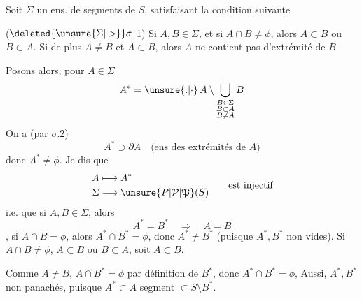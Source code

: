 Soit $\Sigma$ un ens. de segments de $S$, satisfaisant la condition suivante

($\deleted{\unsure{\Sigma|>}}\sigma$ 1) Si $A,B\in\Sigma$, et si $A\cap B\ne\phi$, alors $A\subset B$ ou $B\subset A$.  Si de plus $A\ne B$ et $A\subset B$, alors $A$ ne contient pas d'extrémité de $B$.

Posons alors, pour $A\in\Sigma$
\[
 A^*=\unsure{.|\cdot}\, A\setminus\bigcup_{\substack{B\in\Sigma\\ B\subset A\\ B\ne A}} B
\]
On a (par $\sigma.2$)
\[
 A^*\supset\partial A\quad\text{(ens des extrémités de $A$)}
\]
donc $A^*\ne\phi$. Je dis que
\[
 \begin{aligned}
 A&\longmapsto A^*\\
 \Sigma&\longrightarrow \unsure{P|\mathcal P|\mathfrak P}(S)
 \end{aligned}
 \qquad\text{est injectif}
\]
i.e. que si $A,B\in\Sigma$, alors
\[
 A^*=B^*\quad\Longrightarrow\quad A=B
\]
 , si $A\cap B=\phi$, alors $A^*\cap B^*=\phi$, donc $A^*\ne B^*$ (puisque $A^*,B^*$ non vides). Si $A\cap B\ne\phi$,   $A\subset B$ ou $B\subset A$, soit $A\subset B$.

 Comme $A\ne B$, $A\cap B^*=\phi$ par définition de $B^*$, donc $A^*\cap B^*=\phi$,   Aussi, $A^*,B^*$ non panachés, puisque $A^*\subset A$ segment $\subset S\setminus B^*$.
